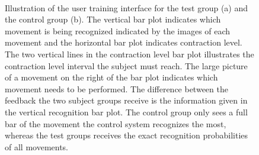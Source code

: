 \begin{figure}[H] 
	\centering
	 \\
	\caption{Illustration of the user training interface for the test group (a) and the control group (b). The vertical bar plot indicates which movement is being recognized indicated by the images of each movement and the horizontal bar plot indicates contraction level. The two vertical lines in the contraction level bar plot illustrates the contraction level interval the subject must reach. The large picture of a movement on the right of the bar plot indicates which movement needs to be performed. The difference between the feedback the two subject groups receive is the information given in the vertical recognition bar plot. The control group only sees a full bar of the movement the control system recognizes the most, whereas the test groups receives the exact recognition probabilities of all movements.}
	\label{fig:feedbackGUI}
\end{figure}

